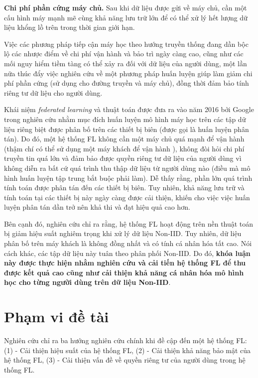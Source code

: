 \textbf{Chi phí phần cứng máy chủ.} Sau khi dữ liệu được gửi về máy chủ, cần một cấu hình máy mạnh mẽ cùng khả năng lưu trữ lớn để có thể xử lý hết lượng dữ liệu khổng lồ trên trong thời gian giới hạn.

Việc các phương pháp tiếp cận máy học theo hướng truyền thống đang dần bộc lộ các nhược điểm về chi phí vận hành và bảo trì ngày càng cao, cũng như các mối nguy hiểm tiềm tàng có thể xảy ra đối với dữ liệu của người dùng, một lần nữa thúc đẩy việc nghiên cứu về một phương pháp huấn luyện giúp làm giảm chi phí phần cứng (sử dụng cho đường truyền và máy chủ), đồng thời đảm bảo tính riêng tư dữ liệu cho người dùng.

Khái niệm \textit{federated learning} và thuật toán  được đưa ra vào năm 2016 bởi Google trong nghiên cứu \cite{mcmahan2017communication} nhằm mục đích huấn luyện mô hình máy học trên các tập dữ liệu riêng biệt được phân bố trên các thiết bị biên (được gọi là huấn luyện phân tán). Do đó, một hệ thống FL không cần một máy chủ quá mạnh để vận hành (thậm chí có thể sử dụng một máy khách để vận hành \cite{yin2021comprehensive}), không đòi hỏi chi phí truyền tin quá lớn và đảm bảo được quyền riêng tư dữ liệu của người dùng vì không diễn ra bất cứ quá trình thu thập dữ liệu từ người dùng nào (điều mà mô hình huấn luyện tập trung bắt buộc phải làm). Dễ thấy rằng, phần lớn quá trình tính toán được phân tán đến các thiết bị biên. Tuy nhiên, khả năng lưu trữ và tính toán tại các thiết bị này ngày càng được cải thiện, khiến cho việc việc huấn luyện phân tán dần trở nên khả thi và đạt hiệu quả cao hơn.

Bên cạnh đó, nghiên cứu \cite{zhao2018federated} chỉ ra rằng, hệ thống FL hoạt động trên nền thuật toán  bị giảm hiệu suất nghiêm trọng khi xử lý dữ liệu Non-IID. Tuy nhiên, dữ liệu phân bố trên máy khách là không đồng nhất và có tính cá nhân hóa tất cao. Nói cách khác, các tập dữ liệu này tuân theo phân phối Non-IID. Do đó, \textbf{khóa luận này được thực hiện nhằm nghiên cứu và cải tiến hệ thống FL để thu được kết quả cao cũng như cải thiện khả năng cá nhân hóa mô hình học cho từng người dùng trên dữ liệu Non-IID}.

\section{Phạm vi đề tài}

Nghiên cứu \cite{yin2021comprehensive} chỉ ra ba hướng nghiên cứu chính khi đề cập đến một hệ thống FL: (1) - Cải thiện hiệu suất của hệ thống FL, (2) - Cải thiện khả năng bảo mật của hệ thống FL, (3) - Cải thiện vấn đề về quyền riêng tư của người dùng trong hệ thống FL.

